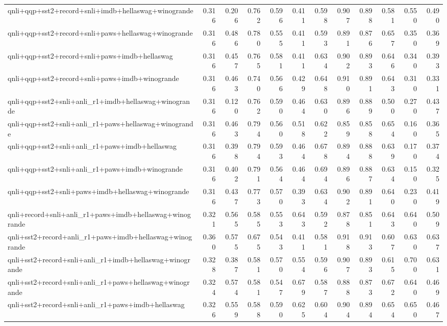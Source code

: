 \begin{table}[t]
\begin{tabular}{lrrrrrrrrrrr}
    qnli+qqp+sst2+record+snli+imdb+hellaswag+winogrande & 0.316 & 0.206 & 0.762 & 0.596 & 0.411 & 0.598 & 0.907 & 0.898 & 0.581 & 0.550 & 0.490 \\
    qnli+qqp+sst2+record+snli+paws+hellaswag+winogrande & 0.316 & 0.486 & 0.780 & 0.555 & 0.411 & 0.593 & 0.891 & 0.876 & 0.657 & 0.350 & 0.369 \\
    qnli+qqp+sst2+record+snli+paws+imdb+hellaswag & 0.316 & 0.457 & 0.765 & 0.581 & 0.411 & 0.634 & 0.902 & 0.893 & 0.646 & 0.340 & 0.393 \\
    qnli+qqp+sst2+record+snli+paws+imdb+winogrande & 0.316 & 0.463 & 0.740 & 0.566 & 0.429 & 0.648 & 0.910 & 0.891 & 0.643 & 0.310 & 0.331 \\
    qnli+qqp+sst2+snli+anli\_r1+imdb+hellaswag+winogrande & 0.316 & 0.120 & 0.762 & 0.590 & 0.464 & 0.630 & 0.896 & 0.889 & 0.500 & 0.270 & 0.437 \\
    qnli+qqp+sst2+snli+anli\_r1+paws+hellaswag+winogrande & 0.316 & 0.463 & 0.794 & 0.560 & 0.518 & 0.622 & 0.859 & 0.858 & 0.654 & 0.160 & 0.365 \\
    qnli+qqp+sst2+snli+anli\_r1+paws+imdb+hellaswag & 0.316 & 0.398 & 0.794 & 0.593 & 0.464 & 0.678 & 0.894 & 0.888 & 0.639 & 0.170 & 0.374 \\
    qnli+qqp+sst2+snli+anli\_r1+paws+imdb+winogrande & 0.316 & 0.402 & 0.791 & 0.564 & 0.464 & 0.694 & 0.896 & 0.887 & 0.634 & 0.150 & 0.325 \\
    qnli+qqp+sst2+snli+paws+imdb+hellaswag+winogrande & 0.316 & 0.437 & 0.773 & 0.570 & 0.393 & 0.634 & 0.902 & 0.891 & 0.640 & 0.230 & 0.419 \\
    qnli+record+snli+anli\_r1+paws+imdb+hellaswag+winogrande & 0.321 & 0.565 & 0.585 & 0.553 & 0.643 & 0.592 & 0.878 & 0.851 & 0.643 & 0.640 & 0.509 \\
    qnli+sst2+record+anli\_r1+paws+imdb+hellaswag+winogrande & 0.360 & 0.575 & 0.675 & 0.543 & 0.411 & 0.581 & 0.918 & 0.913 & 0.607 & 0.630 & 0.637 \\
    qnli+sst2+record+snli+anli\_r1+imdb+hellaswag+winogrande & 0.328 & 0.387 & 0.581 & 0.570 & 0.554 & 0.596 & 0.907 & 0.893 & 0.615 & 0.700 & 0.631 \\
    qnli+sst2+record+snli+anli\_r1+paws+hellaswag+winogrande & 0.324 & 0.574 & 0.581 & 0.547 & 0.679 & 0.587 & 0.888 & 0.873 & 0.672 & 0.640 & 0.469 \\
    qnli+sst2+record+snli+anli\_r1+paws+imdb+hellaswag & 0.326 & 0.559 & 0.588 & 0.590 & 0.625 & 0.604 & 0.904 & 0.894 & 0.654 & 0.650 & 0.467 \\

\end{tabular}
\end{table}
